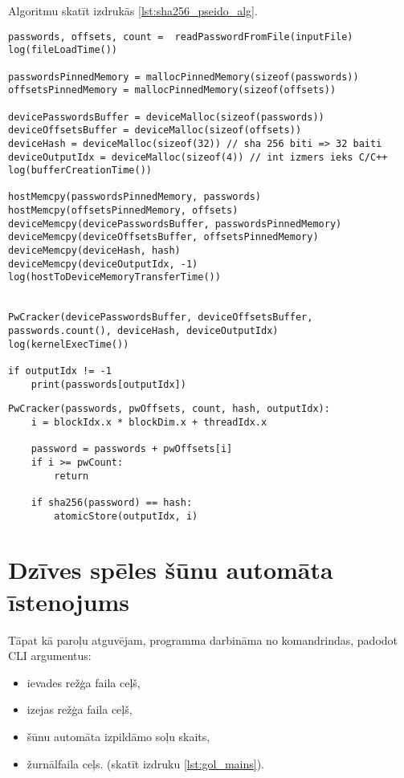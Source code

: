 Algoritmu skatīt izdrukās \ref{lst:sha256_pseido_alg}.
\begin{lstlisting}[caption={Paroļu atguvēja CPU puses pseidokods},
captionpos=b,
    label=lst:sha256_pseido_alg]
passwords, offsets, count =  readPasswordFromFile(inputFile)
log(fileLoadTime())

passwordsPinnedMemory = mallocPinnedMemory(sizeof(passwords))
offsetsPinnedMemory = mallocPinnedMemory(sizeof(offsets))

devicePasswordsBuffer = deviceMalloc(sizeof(passwords))
deviceOffsetsBuffer = deviceMalloc(sizeof(offsets))
deviceHash = deviceMalloc(sizeof(32)) // sha 256 biti => 32 baiti
deviceOutputIdx = deviceMalloc(sizeof(4)) // int izmers ieks C/C++
log(bufferCreationTime())

hostMemcpy(passwordsPinnedMemory, passwords)
hostMemcpy(offsetsPinnedMemory, offsets)
deviceMemcpy(devicePasswordsBuffer, passwordsPinnedMemory)
deviceMemcpy(deviceOffsetsBuffer, offsetsPinnedMemory)
deviceMemcpy(deviceHash, hash)
deviceMemcpy(deviceOutputIdx, -1)
log(hostToDeviceMemoryTransferTime())


PwCracker(devicePasswordsBuffer, deviceOffsetsBuffer, passwords.count(), deviceHash, deviceOutputIdx)
log(kernelExecTime())

if outputIdx != -1
    print(passwords[outputIdx])
\end{lstlisting}


\begin{lstlisting}[caption={Paroļu atguvēja GPGPU kodola pseidokods},
    captionpos=b,
    label=lst:sha256_pseido_alg_device]
PwCracker(passwords, pwOffsets, count, hash, outputIdx):
    i = blockIdx.x * blockDim.x + threadIdx.x

    password = passwords + pwOffsets[i]
    if i >= pwCount:
        return

    if sha256(password) == hash:
        atomicStore(outputIdx, i)
\end{lstlisting}

\section{Dzīves spēles šūnu automāta īstenojums} \label{gol_section}

Tāpat kā paroļu atguvējam, programma darbināma no komandrindas, padodot CLI
argumentus:
\begin{itemize}
    \item ievades režģa faila ceļš,
    \item izejas režģa faila ceļš,
    \item šūnu automāta izpildāmo soļu skaits,
    \item žurnālfaila ceļs. (skatīt izdruku \ref{lst:gol_mains}).
\end{itemize}

